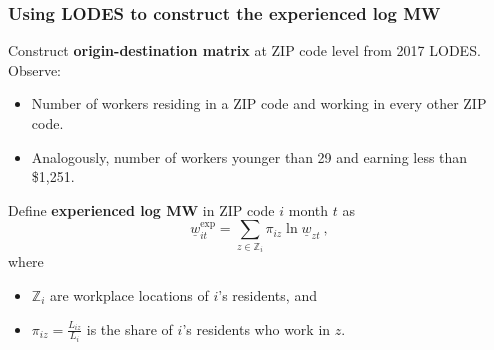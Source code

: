 \begin{frame}
	\frametitle{Using LODES to construct the experienced log MW}
	
	Construct \textbf{origin-destination matrix} at ZIP code level from 2017 LODES.
	Observe:
	\begin{itemize} \small
		\item Number of workers residing in a ZIP code and working in every other 
		ZIP code.
		\item Analogously, number of workers younger than 29 and earning less than 
		\$1,251.
	\end{itemize}
	
	\pause
	\vspace{2.5mm}
	Define \textbf{experienced log MW} in ZIP code $i$ month $t$ as
	$$
	\underline{w}^{\text{exp}}_{it} = 
	\sum_{z \in \mathbb{Z}_i} \pi_{i z} \ln \underline{w}_{zt} \ ,
	$$
	\vspace{-2.5mm}
	where
	\vspace{1mm}
	\begin{itemize} \small
		\item $\mathbb{Z}_i$ are workplace locations of $i$'s residents, and
		\item $\pi_{i z} = \frac{L_{i z}}{L_i}$ is the share of $i$'s residents who work 
		in $z$.
	\end{itemize}
\end{frame}

